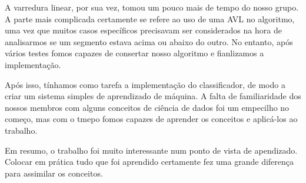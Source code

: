 \documentclass{article}
\begin{document}
A varredura linear, por sua vez, tomou um pouco mais de tempo do nosso grupo. A parte mais complicada certamente se refere ao uso de uma AVL no algoritmo, uma vez que muitos casos específicos precisavam ser considerados na hora de analisarmos se um segmento estava acima ou abaixo do outro. No entanto, após vários testes fomos capazes de consertar nosso algoritmo e fianlizamos a implementação.

Após isso, tínhamos como tarefa a implementação do classificador, de modo a criar um sistema simples de aprendizado de máquina. A falta de familiaridade dos nossos membros com alguns conceitos de ciência de dados foi um empecilho no começo, mas com o tmepo fomos capazes de aprender os conceitos e aplicá-los ao trabalho.

Em resumo, o trabalho foi muito interessante num ponto de vista de apendizado. Colocar em prática tudo que foi aprendido certamente fez uma grande diferença para assimilar os conceitos.

\printbibliography
\end{document}
